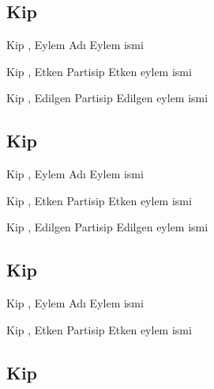 \subsection*{Kip }

\begin{kip}{}{Kip , Eylem Adı}
  Eylem ismi
\end{kip}

\begin{kip}{}{Kip , Etken Partisip}
  Etken eylem ismi
\end{kip}

\begin{kip}{}{Kip , Edilgen Partisip}
  Edilgen eylem ismi
\end{kip}

\subsection*{Kip }

\begin{kip}{}{Kip , Eylem Adı}
  Eylem ismi
\end{kip}

\begin{kip}{}{Kip , Etken Partisip}
  Etken eylem ismi
\end{kip}

\begin{kip}{}{Kip , Edilgen Partisip}
  Edilgen eylem ismi
\end{kip}


\subsection*{Kip }

\begin{kip}{}{Kip , Eylem Adı}
  Eylem ismi
\end{kip}

\begin{kip}{}{Kip , Etken Partisip}
  Etken eylem ismi
\end{kip}


\subsection*{Kip }

